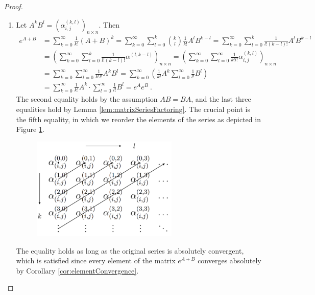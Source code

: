 \begin{proof}
\begin{enumerate}
		\item Let $A^kB^l=(\alpha^{(k,l)}_{i,j})_{n\times n}$. Then
		\begin{align*}
			e^{A+B}
			&=\sum^\infty_{k=0}\frac{1}{k!}(A+B)^{k}
			=\sum^\infty_{k=0}\sum^k_{l=0}\binom{k}{l}\frac{1}{k!}A^{l}B^{k-l}=\sum^\infty_{k=0}\sum^k_{l=0}\frac{1}{l!(k-l)!}A^{l}B^{k-l}
			\\
			&=\left(\sum^\infty_{k=0}\sum^k_{l=0}\frac{1}{l!(k-l)!}\alpha^{(l,k-l)}\right)_{n\times n}
			=\left(\sum^\infty_{k=0}\sum^\infty_{l=0}\frac{1}{k!l!}\alpha^{(k,l)}_{i,j}\right)_{n\times n}
			\\
			&=\sum^\infty_{k=0}\sum^\infty_{l=0}\frac{1}{k!l!}A^kB^l
			=\sum^\infty_{k=0}\left(\frac{1}{k!}A^{k}\sum^\infty_{l=0}\frac{1}{l!}B^{l}\right)
			\\
			&=\sum^\infty_{k=0}\frac{1}{k!}A^{k}\cdot\sum^\infty_{l=0}\frac{1}{l!}B^{l}
			=e^{A}e^{B}\ .
		\end{align*}
		The second equality holds by the assumption $AB=BA$, and the last three equalities hold by Lemma \ref{lem:matrixSeriesFactoring}. The crucial point is the fifth equality, in which we reorder the elements of the series as depicted in Figure \ref{fig:reordering}. 
		\begin{figure}[hp]
			\centering
			\includegraphics[width=70mm]{reordering_cropped.pdf}
			\captionsetup{justification=centering,margin=2cm}
			\label{fig:reordering}
		\end{figure}
		The equality holds as long as the original series is absolutely convergent, which is satisfied since every element of the matrix $e^{A+B}$ converges absolutely by Corollary \ref{cor:elementConvergence}.
	\end{enumerate}
\end{proof}

